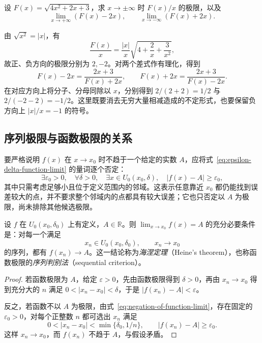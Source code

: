 \documentclass[UTF8,12pt,a4paper,fontset=fandol]{ctexbook}
\begin{document}
\begin{example}
\label{ex:radical-limits-at-infinity}
设 $F(x)=\sqrt{4x^2+2x+3}$，求 $x\to\pm\infty$ 时 $F(x)/x$ 的极限，以及
\[
    \lim_{x\to+\infty}(F(x)-2x),
    \qquad \lim_{x\to-\infty}(F(x)+2x).
\]
\end{example}

\begin{solve}
由 $\sqrt{x^2}=|x|$，有
\[
    \frac{F(x)}x=\frac{|x|}x\sqrt{4+\frac2x+\frac3{x^2}},
\]
故正、负方向的极限分别为 $2,-2$。对两个差式作有理化，得到
\[
    F(x)-2x=\frac{2x+3}{F(x)+2x},
    \qquad
    F(x)+2x=\frac{2x+3}{F(x)-2x}.
\]
在对应方向上将分子、分母同除以 $x$，分别得到 $2/(2+2)=1/2$ 与 $2/(-2-2)=-1/2$。这里既要消去无穷大量相减造成的不定形式，也要保留负方向上 $|x|/x=-1$ 的符号。
\end{solve}

\subsection{序列极限与函数极限的关系}
\label{subsec:sequence-and-function-limits}

要严格说明 $f(x)$ 在 $x\to x_0$ 时不趋于一个给定的实数 $A$，应将式~\eqref{eq:epsilon-delta-function-limit} 的量词逐个否定：
\begin{equation}
    \exists\varepsilon_0>0,\quad\forall\delta>0,\quad
    \exists x\in U_0(x_0,\delta),\quad |f(x)-A|\geq\varepsilon_0,
    \label{eq:negation-of-function-limit}
\end{equation}
其中只需考虑足够小且位于定义范围内的邻域。这表示任意靠近 $x_0$ 都仍能找到误差较大的点，并不要求整个邻域内的点都具有较大误差；它也只否定以 $A$ 为极限，尚未排除其他候选极限。

\begin{theorem}[海涅定理]
\label{thm:heine-sequential-criterion}
设 $f$ 在 $U_0(x_0,\delta_0)$ 上有定义，$A\in\mathbb{R}$。则 $\lim_{x\to x_0}f(x)=A$ 的充分必要条件是：对每一个满足
\[
    x_n\in U_0(x_0,\delta_0),\qquad x_n\to x_0
\]
的序列，都有 $f(x_n)\to A$。这一结论称为\emph{海涅定理}（Heine's theorem），也称函数极限的\emph{序列判别法}（sequential criterion）。
\end{theorem}

\begin{proof}
若函数极限为 $A$，给定 $\varepsilon>0$，先由函数极限得到 $\delta>0$，再由 $x_n\to x_0$ 得到充分大的 $n$ 满足 $0<|x_n-x_0|<\delta$，于是 $|f(x_n)-A|<\varepsilon$。

反之，若函数不以 $A$ 为极限，由式~\eqref{eq:negation-of-function-limit}，存在固定的 $\varepsilon_0>0$，对每个正整数 $n$ 都可选出 $x_n$ 满足
\[
    0<|x_n-x_0|<\min\{\delta_0,1/n\},
    \qquad |f(x_n)-A|\geq\varepsilon_0.
\]
这样 $x_n\to x_0$，而 $f(x_n)$ 不趋于 $A$，与假设矛盾。
\end{proof}
\end{document}
